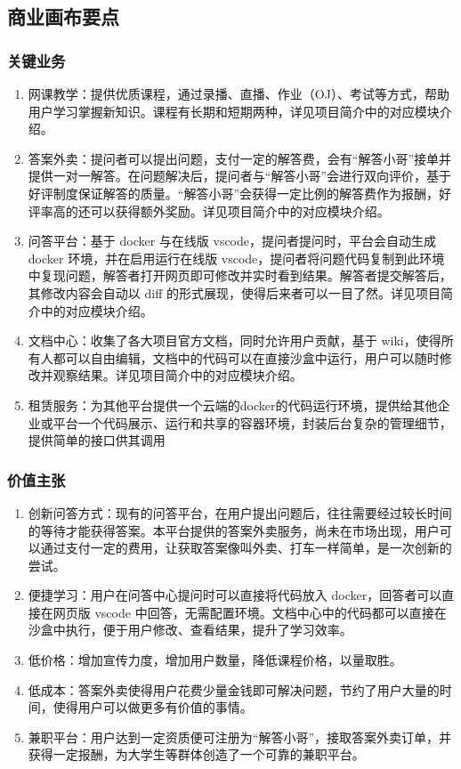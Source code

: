 \documentclass[a4paper]{ctexart}
\begin{document}
\subsection{商业画布要点}

\subsubsection{关键业务}

\begin{enumerate}[label=\alph*.]
  \item 网课教学：提供优质课程，通过录播、直播、作业（OJ）、考试等方式，帮助用户学习掌握新知识。课程有长期和短期两种，详见项目简介中的对应模块介绍。
  \item 答案外卖：提问者可以提出问题，支付一定的解答费，会有“解答小哥”接单并提供一对一解答。在问题解决后，提问者与“解答小哥”会进行双向评价，基于好评制度保证解答的质量。“解答小哥”会获得一定比例的解答费作为报酬，好评率高的还可以获得额外奖励。详见项目简介中的对应模块介绍。
  \item 问答平台：基于 docker 与在线版 vscode，提问者提问时，平台会自动生成 docker 环境，并在启用运行在线版 vscode，提问者将问题代码复制到此环境中复现问题，解答者打开网页即可修改并实时看到结果。解答者提交解答后，其修改内容会自动以 diff 的形式展现，使得后来者可以一目了然。详见项目简介中的对应模块介绍。
  \item 文档中心：收集了各大项目官方文档，同时允许用户贡献，基于 wiki，使得所有人都可以自由编辑，文档中的代码可以在直接沙盒中运行，用户可以随时修改并观察结果。详见项目简介中的对应模块介绍。
  \item 租赁服务：为其他平台提供一个云端的docker的代码运行环境，提供给其他企业或平台一个代码展示、运行和共享的容器环境，封装后台复杂的管理细节，提供简单的接口供其调用
\end{enumerate}

\subsubsection{价值主张}

\begin{enumerate}[label=\alph*.]
  \item 创新问答方式：现有的问答平台，在用户提出问题后，往往需要经过较长时间的等待才能获得答案。本平台提供的答案外卖服务，尚未在市场出现，用户可以通过支付一定的费用，让获取答案像叫外卖、打车一样简单，是一次创新的尝试。
  \item 便捷学习：用户在问答中心提问时可以直接将代码放入 docker，回答者可以直接在网页版 vscode 中回答，无需配置环境。文档中心中的代码都可以直接在沙盒中执行，便于用户修改、查看结果，提升了学习效率。
  \item 低价格：增加宣传力度，增加用户数量，降低课程价格，以量取胜。
  \item 低成本：答案外卖使得用户花费少量金钱即可解决问题，节约了用户大量的时间，使得用户可以做更多有价值的事情。
  \item 兼职平台：用户达到一定资质便可注册为“解答小哥”，接取答案外卖订单，并获得一定报酬，为大学生等群体创造了一个可靠的兼职平台。
\end{enumerate}
\end{document}

